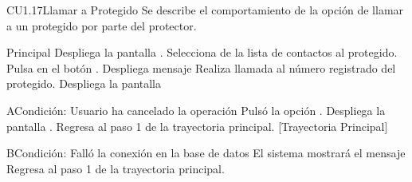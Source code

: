 \begin{UseCase}{CU1.17}{Llamar a Protegido}{
	Se describe el comportamiento de la opción de llamar a un protegido por parte del protector.}
	\end{UseCase}


	\begin{UCtrayectoria}{Principal}
		\UCpaso[\UCsist] Despliega la pantalla .
		\UCpaso[\UCactor] Selecciona de la lista de contactos al protegido.
		\UCpaso[\UCactor] Pulsa en el botón .
		\UCpaso[\UCsist] Despliega mensaje  
		\UCpaso[\UCsist] Realiza llamada al número registrado del protegido. 
		\UCpaso[\UCsist] Despliega la pantalla  
	\end{UCtrayectoria}


	\begin{UCtrayectoriaA}{A}{Condición: Usuario ha cancelado la operación}
		\UCpaso[\UCactor] Pulsó la opción .
		\UCpaso[\UCsist] Despliega la pantalla .
		\UCpaso[\UCsist] Regresa al paso 1 de la trayectoria principal. [Trayectoria Principal]
	\end{UCtrayectoriaA}

	\begin{UCtrayectoriaA}{B}{Condición: Falló la conexión en la base de datos}
		\UCpaso[\UCsist] El sistema mostrará el mensaje 
		\UCpaso[\UCsist] Regresa al paso 1 de la trayectoria principal. 
	\end{UCtrayectoriaA}
